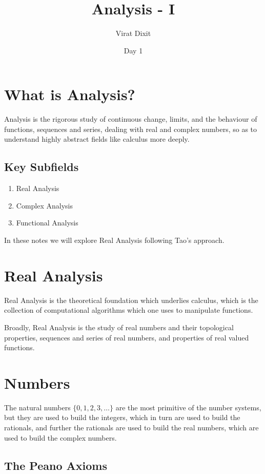 \documentclass{article}
\title{Analysis - I}
\author{Virat Dixit}
\date{Day 1}
\begin{document}
\maketitle

\section{What is Analysis?}

Analysis is the rigorous study of continuous change, limits, and the behaviour of functions, sequences and series, dealing with real and complex numbers, so as to understand highly abstract fields like calculus more deeply.

\subsection*{Key Subfields}
\begin{enumerate}
    \item Real Analysis
    \item Complex Analysis
    \item Functional Analysis
\end{enumerate}

In these notes we will explore Real Analysis following Tao's approach.

\section{Real Analysis}

Real Analysis is the theoretical foundation which underlies calculus, which is the collection of computational algorithms which one uses to manipulate functions.

\medskip
Broadly, Real Analysis is the study of real numbers and their topological properties, sequences and series of real numbers, and properties of real valued functions.

\section{Numbers}

The natural numbers $\{0, 1, 2, 3, \ldots\}$ are the most primitive of the number systems, but they are used to build the integers, which in turn are used to build the rationals, and further the rationals are used to build the real numbers, which are used to build the complex numbers.

\subsection*{The Peano Axioms}
\end{document}
